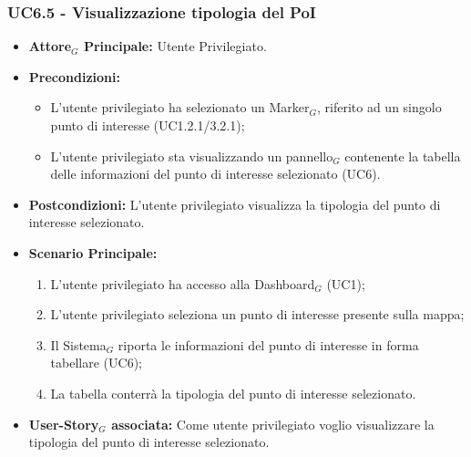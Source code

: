 \documentclass[10pt]{article}
\begin{document}
\begin{justify}
 \subsubsection{\textbf{UC6.5 - Visualizzazione tipologia del PoI}}
 \begin{itemize}
     \item \textbf{Attore$_G$ Principale:} Utente Privilegiato.
     \item \textbf{Precondizioni:}
       \begin{itemize}
    	        \item L'utente privilegiato ha selezionato un Marker$_G$, riferito ad un singolo punto di interesse (UC1.2.1/3.2.1);
          \item L'utente privilegiato sta visualizzando un pannello$_G$ contenente la tabella delle informazioni del punto di interesse selezionato (UC6).
       \end{itemize}
     \item \textbf{Postcondizioni:} L'utente privilegiato visualizza la tipologia del punto di interesse selezionato.
     \item \textbf{Scenario Principale:}
        \begin{enumerate}
            \item L'utente privilegiato ha accesso alla Dashboard$_G$ (UC1);
            \item L'utente privilegiato seleziona un punto di interesse presente sulla mappa;
            \item Il Sistema$_G$ riporta le informazioni del punto di interesse in forma tabellare (UC6);
            \item La tabella conterrà la tipologia del punto di interesse selezionato.
        \end{enumerate}
     \item \textbf{User-Story$_G$ associata:} Come utente privilegiato voglio visualizzare la tipologia del punto di interesse selezionato. 
 \end{itemize}

\end{justify}
\end{document}
